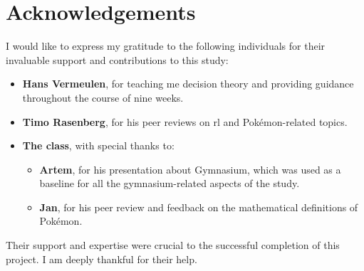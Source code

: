 \section*{Acknowledgements}

I would like to express my gratitude to the following individuals for their invaluable support and contributions to this study:

\begin{itemize}
    \item \textbf{Hans Vermeulen}, for teaching me decision theory and providing guidance throughout the course of nine weeks.
    \item \textbf{Timo Rasenberg}, for his peer reviews on \gls{rl} and Pokémon-related topics. 
    \item \textbf{The class}, with special thanks to:
    \begin{itemize}
        \item \textbf{Artem}, for his presentation about Gymnasium, which was used as a baseline for all the gymnasium-related aspects of the study.
        \item \textbf{Jan}, for his peer review and feedback on the mathematical definitions of Pokémon.
    \end{itemize}
\end{itemize}

Their support and expertise were crucial to the successful completion of this project. I am deeply thankful for their help.
